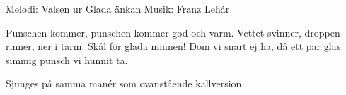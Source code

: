 \begin{song}

\begin{songmeta}
Melodi: Valsen ur Glada änkan
Musik: Franz Lehár
\end{songmeta}

\begin{songtext}
Punschen kommer, punschen kommer
god och varm.
Vettet svinner, droppen rinner,
ner i tarm.
Skål för glada minnen!
Dom vi snart ej ha,
då ett par glas simmig punsch vi hunnit ta.
\end{songtext}

\begin{songnotes}
Sjunges på samma manér som ovanstående kallversion.
\end{songnotes}

\end{song}
